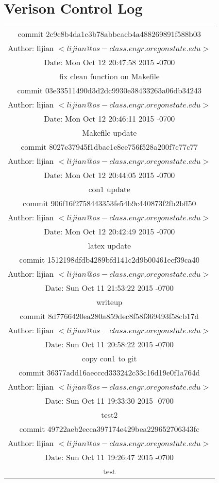 \documentclass[letterpaper,11pt,titlepage]{article}
\begin{document}
\section{Verison Control Log}

\begin{table}[!hbp]
\begin{tabular}{|c|}

\hline
commit 2c9c8b4da1c3b78abbcacb4a488269891f588b03\\
Author: lijian  $<lijian@os-class.engr.oregonstate.edu>$ \\
Date: Mon Oct 12 20:47:58 2015 -0700\\
fix clean function on Makefile\\
\hline
commit 03e33511490d3d2dc9930e38433263a06db34243\\
Author: lijian $<lijian@os-class.engr.oregonstate.edu>$\\
Date:   Mon Oct 12 20:46:11 2015 -0700\\
 Makefile update\\
\hline
commit 8027e37945f1dbae1e8ee756f528a200f7c77c77\\
Author: lijian $<lijian@os-class.engr.oregonstate.edu>$\\
Date:   Mon Oct 12 20:44:05 2015 -0700\\
con1 update\\
\hline
commit 906f16f2758443353fe54b9c440873f2fb2bff50\\
Author: lijian $<lijian@os-class.engr.oregonstate.edu>$\\
Date:   Mon Oct 12 20:42:49 2015 -0700\\
latex update\\
\hline
commit 1512198dfdb4289bfd141c2d9b00461ecf39ca40\\
Author: lijian $<lijian@os-class.engr.oregonstate.edu>$\\
Date:   Sun Oct 11 21:53:22 2015 -0700\\
writeup\\
\hline
commit 8d7766420ea280a859dec8f58f369493f58cb17d\\
Author: lijian $<lijian@os-class.engr.oregonstate.edu>$\\
Date:   Sun Oct 11 20:58:22 2015 -0700\\
copy con1 to git\\
\hline
commit 36377add16aecccd333242c33c16d19e0f1a764d\\
Author: lijian $<lijian@os-class.engr.oregonstate.edu>$\\
Date:   Sun Oct 11 19:33:30 2015 -0700\\
test2\\
\hline
commit 49722aeb2ecca397174e429bea229652706343fc\\
Author: lijian $<lijian@os-class.engr.oregonstate.edu>$\\
Date:   Sun Oct 11 19:26:47 2015 -0700\\
test\\
\hline
 
 
\end{tabular}
\end{table}
\end{document}
